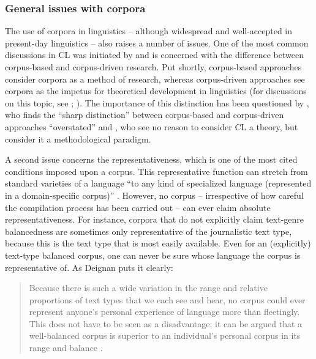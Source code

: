 \subsubsection{General issues with corpora}
\label{sec:2.2.1.4}  
The use of corpora in linguistics – although widespread and well-accepted in present-day linguistics – also raises a number of issues. One of the most common discussions in CL was initiated by \citet{tognini-bonelli_corpus_2001} and is concerned with the difference between cor\-pus-based and corpus-driven research. Put shortly, corpus-based approaches consider corpora as a method of research, whereas cor\-pus-driven approaches see corpora as the impetus for theoretical development in linguistics (for discussions on this topic, see \citealt[384--385]{hardie_two_2010}; \citealt[150 ff.]{mcenery_corpus_2012}). The importance of this distinction has been questioned by \citet[994]{ludeling_theory-driven_2009}, who finds the “sharp distinction” between corpus-based and corpus-driven approaches “overstated” and \citet[328]{gries_behavioral_2010}, who see no reason to consider CL a theory, but consider it a methodological paradigm.

A second issue concerns the representativeness, which is one of the most cited conditions imposed upon a corpus. This representative function can stretch from standard varieties of a language “to any kind of specialized language (represented in a domain-specific corpus)” \citep[11]{aijmer_state_1991}. However, no corpus – irrespective of how careful the compilation process has been carried out – can ever claim absolute representativeness. For instance, corpora that do not explicitly claim text-genre balancedness are sometimes only representative of the journalistic text type, because this is the text type that is most easily available. Even for an (explicitly) text-type balanced corpus, one can never be sure whose language the corpus is representative of. As Deignan puts it clearly:

\begin{quote}
Because there is such a wide variation in the range and relative proportions of text types that we each see and hear, no corpus could ever represent anyone’s personal experience of language more than fleetingly. This does not have to be seen as a disadvantage; it can be argued that a well-balanced corpus is superior to an individual’s personal corpus in its range and balance \citep[91]{deignan_metaphor_2005}.
\end{quote}

